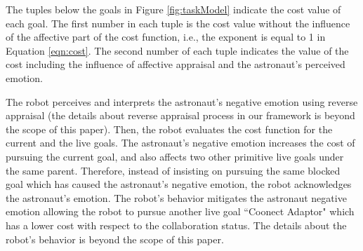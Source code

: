 \documentclass[conference]{IEEEtran}
\begin{document}
\vspace*{-1mm}
The tuples below the goals in Figure \ref{fig:taskModel} indicate the cost value
of each goal. The first number in each tuple is the cost value without the
influence of the affective part of the cost function, i.e., the exponent is
equal to 1 in Equation \ref{eqn:cost}. The second number of each tuple indicates
the value of the cost including the influence of affective appraisal and the
astronaut's perceived emotion.

The robot perceives and interprets the astronaut's negative emotion using
reverse appraisal (the details about reverse appraisal process in our framework
is beyond the scope of this paper). Then, the robot evaluates the cost function
for the current and the live goals. The astronaut's negative emotion increases
the cost of pursuing the current goal, and also affects two other primitive live
goals under the same parent. Therefore, instead of insisting on pursuing the
same blocked goal which has caused the astronaut's negative emotion, the robot
acknowledges the astronaut's emotion. The robot's behavior mitigates the
astronaut negative emotion allowing the robot to pursue another live goal
``Coonect Adaptor" which has a lower cost with respect to the collaboration
status. The details about the robot's behavior is beyond the scope of this
paper.

%
%

\end{document}
